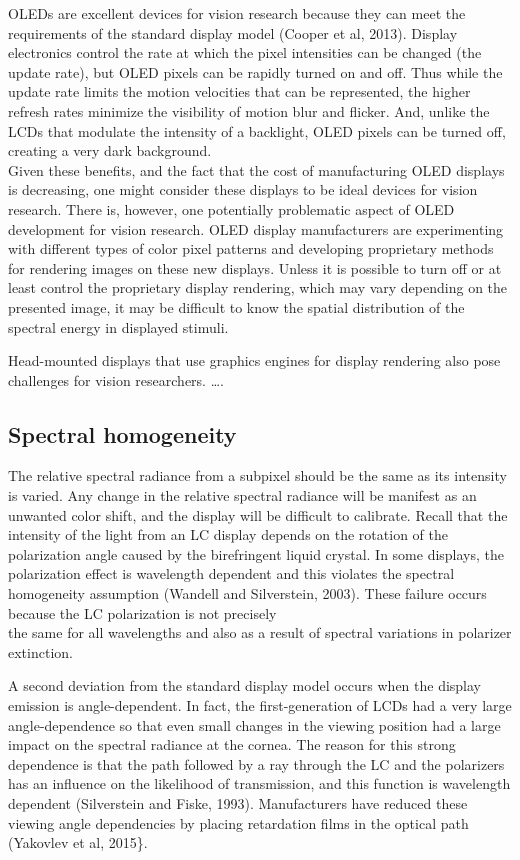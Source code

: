 \documentclass[
  letterpaper,
]{book}
\begin{document}
OLEDs are excellent devices for vision research because they can meet
the requirements of the standard display model (Cooper et al, 2013).
Display electronics control the rate at which the pixel intensities can
be changed (the update rate), but OLED pixels can be rapidly turned on
and off. Thus while the update rate limits the motion velocities that
can be represented, the higher refresh rates minimize the visibility of
motion blur and flicker. And, unlike the LCDs that modulate the
intensity of a backlight, OLED pixels can be turned off, creating a very
dark background.\\
Given these benefits, and the fact that the cost of manufacturing OLED
displays is decreasing, one might consider these displays to be ideal
devices for vision research. There is, however, one potentially
problematic aspect of OLED development for vision research. OLED display
manufacturers are experimenting with different types of color pixel
patterns and developing proprietary methods for rendering images on
these new displays. Unless it is possible to turn off or at least
control the proprietary display rendering, which may vary depending on
the presented image, it may be difficult to know the spatial
distribution of the spectral energy in displayed stimuli.

Head-mounted displays that use graphics engines for display rendering
also pose challenges for vision researchers. \ldots.

\subsection{\texorpdfstring{\textbf{Spectral
homogeneity}}{Spectral homogeneity}}\label{spectral-homogeneity}

The relative spectral radiance from a subpixel should be the same as its
intensity is varied. Any change in the relative spectral radiance will
be manifest as an unwanted color shift, and the display will be
difficult to calibrate. Recall that the intensity of the light from an
LC display depends on the rotation of the polarization angle caused by
the birefringent liquid crystal. In some displays, the polarization
effect is wavelength dependent and this violates the spectral
homogeneity assumption (Wandell and Silverstein, 2003). These failure
occurs because the LC polarization is not precisely\\
the same for all wavelengths and also as a result of spectral variations
in polarizer extinction.

A second deviation from the standard display model occurs when the
display emission is angle-dependent. In fact, the first-generation of
LCDs had a very large angle-dependence so that even small changes in the
viewing position had a large impact on the spectral radiance at the
cornea. The reason for this strong dependence is that the path followed
by a ray through the LC and the polarizers has an influence on the
likelihood of transmission, and this function is wavelength dependent
(Silverstein and Fiske, 1993). Manufacturers have reduced these viewing
angle dependencies by placing retardation films in the optical path
(Yakovlev et al, 2015\}.
\end{document}
